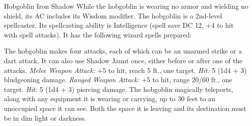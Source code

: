 \documentclass[10pt,a4paper,twoside,twocolumn,openany,bg=print,nodeprecatedcode]{dndbook}
\begin{document}
\begin{DndMonster}[float*=t]{Hobgoblin Iron Shadow}
\DndMonsterBasics[
armor-class = {15},
hit-points = {\DndDice{5d8 + 10}},
speed = {40 ft.}
]
\DndMonsterAbilityScores[
 str = 14,
 dex = 16,
 con = 15,
 int = 14,
 wis = 15,
 cha = 11
]
\DndMonsterDetails[
skills = {Acrobatics +5, Athletics +4, Stealth +5},
senses = {darkvision 60 ft., passive perception 12},
languages = {Common, Goblin},
challenge = 2,
]
While the hobgoblin is wearing no armor and wielding no shield, its AC includes its Wisdom modifier.
The hobgoblin is a 2nd-level spellcaster. Its spellcasting ability is Intelligence (spell save DC 12, +4 to hit with spell attacks). It has the following wizard spells prepared:
\begin{DndMonsterSpells}
\end{DndMonsterSpells}
\par
{}
The hobgoblin makes four attacks, each of which can be an unarmed strike or a dart attack. It can also use Shadow Jaunt once, either before or after one of the attacks.
\textsl{Melee Weapon Attack:} +5 to hit, reach 5 ft., one target. \textsl{Hit:} 5 (1d4 + 3) bludgeoning damage.
\textsl{Ranged Weapon Attack:} +5 to hit, range 20/60 ft., one target. \textsl{Hit:} 5 (1d4 + 3) piercing damage.
The hobgoblin magically teleports, along with any equipment it is wearing or carrying, up to 30 feet to an unoccupied space it can see. Both the space it is leaving and its destination must be in dim light or darkness.
\end{DndMonster}
\end{document}
